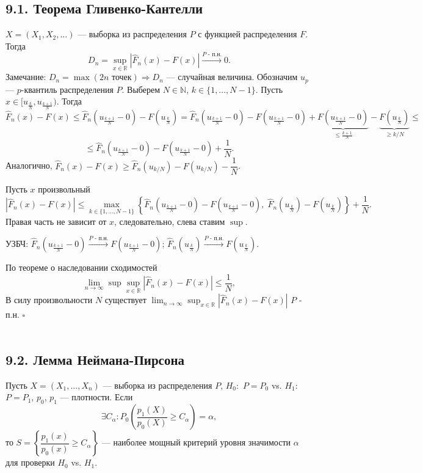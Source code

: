\documentclass[12pt]{report}
\renewenvironment{proof}{{\bfseries Доказательство:}}{$\square$\\\\}
\theoremstyle{definition}
\begin{document}
\subsection{9.1. Теорема Гливенко-Кантелли}
$X = (X_1, X_2, \ldots)$ — выборка из распределения $P$ с функцией распределения $F$. Тогда
$$D_n = \displaystyle{\sup_{x \in \mathbb{R}}}|\hat{F}_n(x) - F(x)|\xrightarrow{P \text{ - п.н.}} 0.$$
\begin{proof}
	Замечание: $D_n = \max(2n \text{ точек}) \Rightarrow D_n$ — случайная величина. Обозначим $u_p$ — $p$-квантиль распределения $P$. Выберем $N \in \mathbb{N}$, $k \in \{1, \ldots, N-1\}$. Пусть $x \in [u_{\frac{k}{N}}, u_{\frac{k+1}{N}})$. Тогда
	$$\hat{F}_n(x) - F(x) \leqslant \hat{F}_n(u_{\frac{k + 1}{N}} - 0) - F(u_{\frac{k}{N}}) = \hat{F}_n(u_{\frac{k + 1}{N}} - 0) - F(u_{\frac{k+1}{N}} - 0) + \underbrace{F(u_{\frac{k+1}{N}} - 0)}_{\leqslant \frac{k+1}{N}} - \underbrace{F(u_{\frac{k}{N}})}_{\geqslant k/N} \leqslant$$
	$$\leqslant \hat{F}_n(u_{\frac{k + 1}{N}} - 0) - F(u_{\frac{k + 1}{N}} - 0) + \dfrac{1}{N}.$$
	Аналогично, $\hat{F}_n(x) - F(x) \geqslant \hat{F}_n(u_{k/N}) - F(u_{k/N}) - \dfrac{1}{N}$.

	Пусть $x$ произвольный
	$$|\hat{F}_n(x) - F(x)| \leqslant \displaystyle{\max_{k \in \{1, \ldots, N-1\}}} \left\{\hat{F}_n\left(u_{\frac{k+1}{N}} - 0\right) - F\left(u_{\frac{k+1}{N}} - 0\right), \; \hat{F}_n\left(u_{\frac{k}{N}}\right) - F\left(u_{\frac{k}{N}}\right)\right\} + \dfrac{1}{N}.$$
	Правая часть не зависит от $x$, следовательно, слева ставим $\sup$.
	
	УЗБЧ: $\hat{F}_n\left(u_{\frac{k+1}{N}} - 0\right) \xrightarrow{P \text{ - п.н.}} F\left(u_{\frac{k+1}{N}} - 0\right)$; $\hat{F}_n\left(u_{\frac{k}{N}}\right) \xrightarrow{P \text{ - п.н.}} F\left(u_{\frac{k}{N}}\right)$.
	
	По теореме о наследовании сходимостей
	$$\displaystyle{\lim_{n\to \infty}} \sup \displaystyle{\sup_{x \in \mathbb{R}}} |\hat{F}_n(x) - F(x)| \leqslant \dfrac{1}{N},$$
	В силу произвольности $N$ существует $\displaystyle{\lim_{n\to \infty}}\displaystyle{\sup_{x \in \mathbb{R}}} |\hat{F}_n(x) - F(x)|$ $P$ - п.н.
\end{proof}

\subsection{9.2. Лемма Неймана-Пирсона}
Пусть $X = (X_1, \ldots, X_n)$ — выборка из распределения $P$, $H_0:$ $P = P_0$ vs. $H_1$: $P = P_1$, $p_0$, $p_1$ — плотности. Если
$$\exists C_\alpha : P_0\left(\dfrac{p_1(X)}{p_0(X)} \geqslant C_\alpha\right) = \alpha,$$
то $S = \left\{\dfrac{p_1(x)}{p_0(x)} \geqslant C_\alpha\right\}$ — наиболее мощный критерий уровня значимости $\alpha$ для проверки $H_0$ vs. $H_1$.
\end{document}
